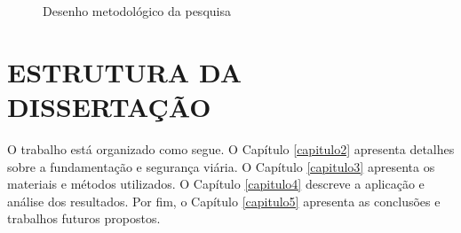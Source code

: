 \begin{figure}[htbp]
  \centering
  \caption{Desenho metodológico da pesquisa}
  \label{fig:desenho_metodologico}
\end{figure}

\section{ESTRUTURA DA DISSERTAÇÃO}

O trabalho está organizado como segue. O Capítulo \ref{capitulo2} apresenta detalhes sobre a fundamentação e segurança viária. O Capítulo \ref{capitulo3} apresenta os materiais e métodos utilizados. O Capítulo \ref{capitulo4} descreve a aplicação e análise dos resultados. Por fim, o Capítulo \ref{capitulo5} apresenta as conclusões e trabalhos futuros propostos.
